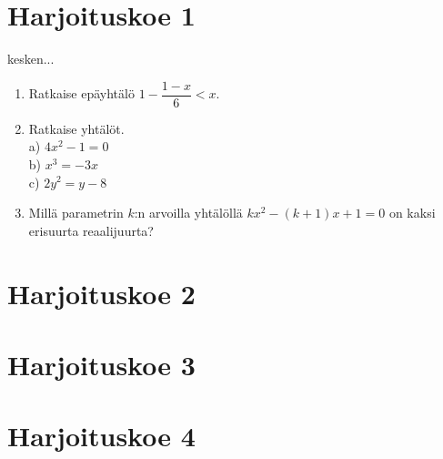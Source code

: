 \section{Harjoituskoe 1}

kesken... 
\begin{enumerate}
\item Ratkaise epäyhtälö $1-\dfrac{1-x}{6}<x$.
\item Ratkaise yhtälöt. \\ a) $4x^2-1=0$ \\ b) $x^3=-3x$ \\ c) $2y^2=y-8$
\item Millä parametrin $k$:n arvoilla yhtälöllä $kx^2-(k+1)x+1=0$ on kaksi erisuurta reaalijuurta? 

\end{enumerate}

\section{Harjoituskoe 2}


\section{Harjoituskoe 3}


\section{Harjoituskoe 4}
